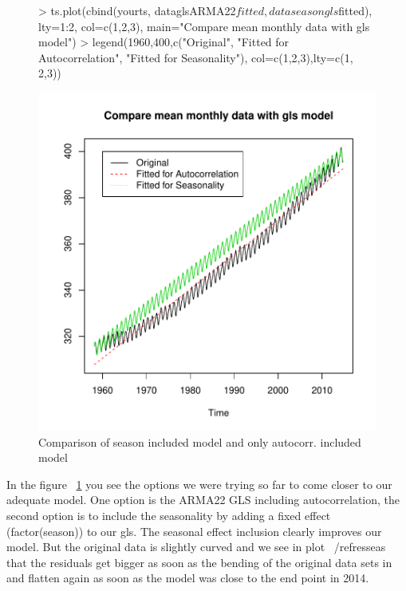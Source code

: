 \documentclass[11pt, a4paper]{article} %
\begin{document}
\begin{figure}[H]
\centering
\begin{Schunk}
\begin{Sinput}
> ts.plot(cbind(yourts, dataglsARMA22$fitted,
               dataseasongls$fitted),
         lty=1:2, col=c(1,2,3), 
         main="Compare mean monthly data with gls model")
> legend(1960,400,c("Original",
                   "Fitted for Autocorrelation",
                   "Fitted for Seasonality"),
        col=c(1,2,3),lty=c(1, 2,3))
\end{Sinput}
\end{Schunk}
\includegraphics{alleselena-036}
\caption{Comparison of season included model and only autocorr. included model}
\label{compseas2}
\end{figure}

In the figure ~\ref{compseas2} you see the options we were trying so far to come closer to our adequate model. One option is the ARMA22 GLS including autocorrelation, the second option is to include the seasonality by adding a fixed effect (factor(season)) to our gls. 
The seasonal effect inclusion clearly improves our model. But the original data is slightly curved and we see in plot ~/ref{resseas} that the residuals get bigger as soon as the bending of the original data sets in and flatten again as soon as the model was close to the end point in 2014. \\
\end{document}

